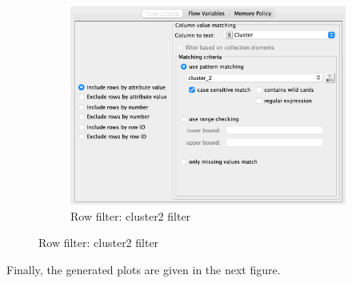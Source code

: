 \documentclass[11pt]{article}
\begin{document}
\begin{figure}[H]
\begin{subfigure}{0.4\textwidth}
					\includegraphics[width=\textwidth]{res/t1/t14/t14-row-filter-3-conf}
					\caption{Row filter: cluster2 filter}
					\label{fig:third}
				\end{subfigure}	
				\label{fig:figures}
			\end{figure}
			\fi
			Finally, the generated plots are given in the next figure.
			\iftrue
\end{document}
